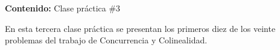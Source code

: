 {\Large
    \textbf{Contenido:} Clase práctica \#3
}

En esta tercera clase práctica se presentan los primeros diez de los veinte problemas del trabajo de Concurrencia y Colinealidad.